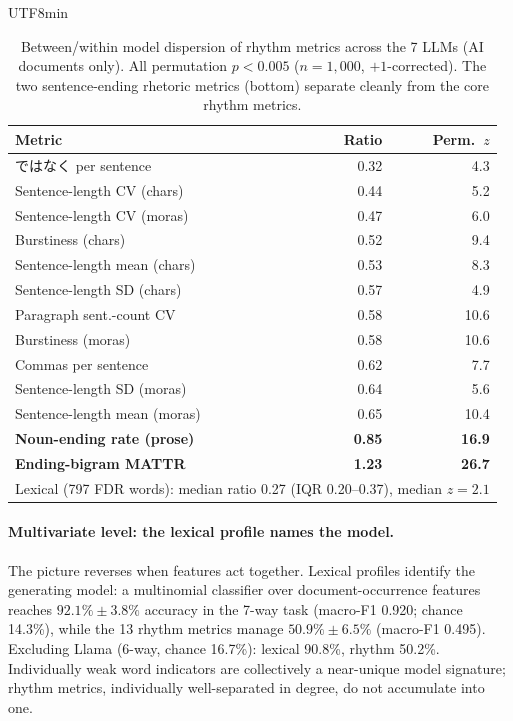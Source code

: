 \documentclass[11pt,a4paper]{article}
\begin{document}
\begin{CJK}{UTF8}{min}
\begin{table}[H]
\centering
\caption{Between/within model dispersion of rhythm metrics across the 7 LLMs (AI documents only). All permutation $p<0.005$ ($n=1{,}000$, $+1$-corrected). The two sentence-ending rhetoric metrics (bottom) separate cleanly from the core rhythm metrics.}
\label{tab:ratios}
\small
\begin{tabular}{lrr}
\toprule
Metric & Ratio & Perm.\ $z$ \\
\midrule
ではなく per sentence & 0.32 & 4.3 \\
Sentence-length CV (chars) & 0.44 & 5.2 \\
Sentence-length CV (moras) & 0.47 & 6.0 \\
Burstiness (chars) & 0.52 & 9.4 \\
Sentence-length mean (chars) & 0.53 & 8.3 \\
Sentence-length SD (chars) & 0.57 & 4.9 \\
Paragraph sent.-count CV & 0.58 & 10.6 \\
Burstiness (moras) & 0.58 & 10.6 \\
Commas per sentence & 0.62 & 7.7 \\
Sentence-length SD (moras) & 0.64 & 5.6 \\
Sentence-length mean (moras) & 0.65 & 10.4 \\
\midrule
\textbf{Noun-ending rate (prose)} & \textbf{0.85} & \textbf{16.9} \\
\textbf{Ending-bigram MATTR} & \textbf{1.23} & \textbf{26.7} \\
\midrule
\multicolumn{3}{l}{Lexical (797 FDR words): median ratio 0.27 (IQR 0.20--0.37), median $z=2.1$}\\
\bottomrule
\end{tabular}
\end{table}

\paragraph{Multivariate level: the lexical profile names the model.}
The picture reverses when features act together. Lexical profiles identify the generating model: a multinomial classifier over document-occurrence features reaches $92.1\% \pm 3.8\%$ accuracy in the 7-way task (macro-F1 0.920; chance 14.3\%), while the 13 rhythm metrics manage $50.9\% \pm 6.5\%$ (macro-F1 0.495). Excluding Llama (6-way, chance 16.7\%): lexical 90.8\%, rhythm 50.2\%. Individually weak word indicators are collectively a near-unique model signature; rhythm metrics, individually well-separated in degree, do not accumulate into one.


\end{CJK}
\end{document}
